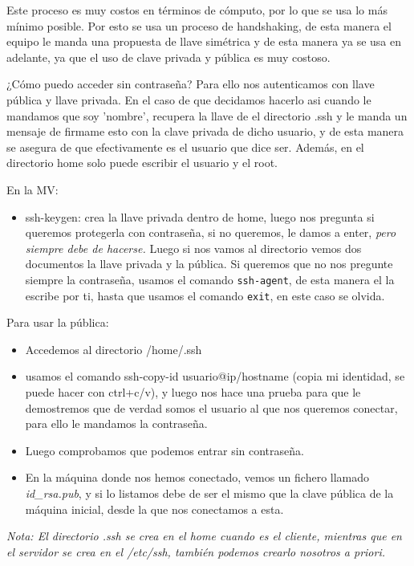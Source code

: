 Este proceso es muy costos en términos de cómputo, por lo que se usa lo más mínimo posible. Por esto se usa un proceso de handshaking, de esta manera el equipo le manda una propuesta de llave simétrica y de esta manera ya se usa en adelante, ya que el uso de clave privada y pública es muy costoso.

¿Cómo puedo acceder sin contraseña? Para ello nos autenticamos con llave pública y llave privada. En el caso de que decidamos hacerlo asi cuando le mandamos que soy 'nombre', recupera la llave de el directorio .ssh y le manda un mensaje de firmame esto con la clave privada de dicho usuario, y de esta manera se asegura de que efectivamente es el usuario que dice ser. Además, en el directorio home solo puede escribir el usuario y el root.

En la MV:

\begin{itemize}
    \item ssh-keygen: crea la llave privada dentro de home, luego nos pregunta si queremos protegerla con contraseña, si no queremos, le damos a enter, \textit{pero siempre debe de hacerse.} Luego si nos vamos al directorio vemos dos documentos la llave privada y la pública. Si queremos que no nos pregunte siempre la contraseña, usamos el comando \texttt{ssh-agent}, de esta manera el la escribe por ti, hasta que usamos el comando \texttt{exit}, en este caso se olvida.
\end{itemize}

Para usar la pública:
\begin{itemize}
    \item Accedemos al directorio /home/.ssh 
    \item usamos el comando ssh-copy-id usuario@{ip/hostname} (copia mi identidad, se puede hacer con ctrl+c/v), y luego nos hace una prueba para que le demostremos que de verdad somos el usuario al que nos queremos conectar, para ello le mandamos la contraseña.
    \item Luego comprobamos que podemos entrar sin contraseña.
    \item En la máquina donde nos hemos conectado, vemos un fichero llamado \textit{id\_rsa.pub}, y si lo listamos debe de ser el mismo que la clave pública de la máquina inicial, desde la que nos conectamos a esta.
\end{itemize}

\textit{Nota: El directorio .ssh se crea en el home cuando es el cliente, mientras que en el servidor se crea en el /etc/ssh, también podemos crearlo nosotros a priori.}

